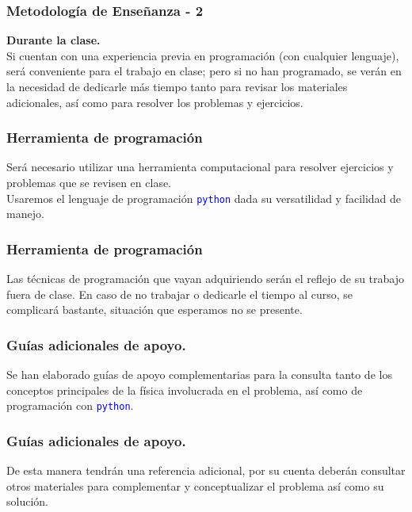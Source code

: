 \begin{frame} 
\frametitle{Metodología de Enseñanza - 2}
\textbf{Durante la clase.}
\\
\vspace{0.5em}
Si cuentan con una experiencia previa en programación (con cualquier lenguaje), será conveniente para el trabajo en clase; pero si no han programado, se verán en la necesidad de dedicarle más tiempo tanto para revisar los materiales adicionales, así como para resolver los problemas y ejercicios.
\end{frame}
\begin{frame}
\frametitle{Herramienta de programación}
Será necesario utilizar una herramienta computacional para resolver ejercicios y problemas que se revisen en clase.
\\
\bigskip
Usaremos el lenguaje de programación \textcolor{blue}{\texttt{python}} dada su versatilidad y facilidad de manejo.
\end{frame}
\begin{frame}
\frametitle{Herramienta de programación}
Las técnicas de programación que vayan adquiriendo serán el reflejo de su trabajo fuera de clase. En caso de no trabajar o dedicarle el tiempo al curso, se complicará bastante, situación que esperamos no se presente.
\end{frame}
\begin{frame}
\frametitle{Guías adicionales de apoyo.}
Se han elaborado guías de apoyo complementarias para la consulta tanto de los conceptos principales de la física involucrada en el problema, así como de programación con \textcolor{blue}{\texttt{python}}.
\end{frame}
\begin{frame}
\frametitle{Guías adicionales de apoyo.}
De esta manera tendrán una referencia adicional, por su cuenta deberán consultar otros materiales para complementar y conceptualizar el problema así como su solución.
\end{frame}
